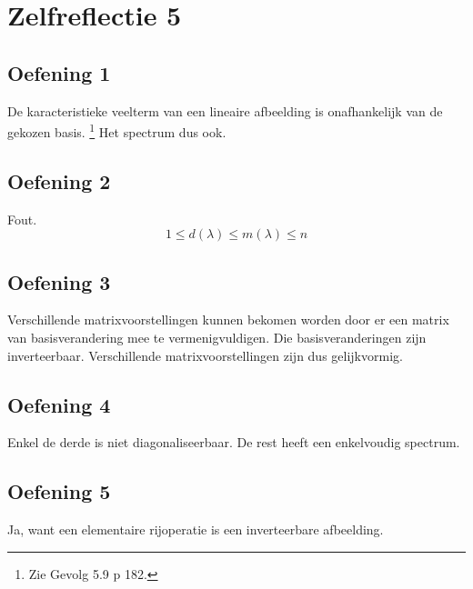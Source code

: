 \documentclass[lineaire_algebra_oplossingen.tex]{subfiles}
\begin{document}
\section{Zelfreflectie 5}
\subsection{Oefening 1}
De karacteristieke veelterm van een lineaire afbeelding is onafhankelijk van de gekozen basis. \footnote{Zie Gevolg 5.9 p 182.}
Het spectrum dus ook.

\subsection{Oefening 2}
Fout.
\[
1 \le d(\lambda) \le m(\lambda) \le n
\]

\subsection{Oefening 3}
Verschillende matrixvoorstellingen kunnen bekomen worden door er een matrix van basisverandering mee te vermenigvuldigen.
Die basisveranderingen zijn inverteerbaar. 
Verschillende matrixvoorstellingen zijn dus gelijkvormig.

\subsection{Oefening 4}
Enkel de derde is niet diagonaliseerbaar. De rest heeft een enkelvoudig spectrum.

\subsection{Oefening 5}
Ja, want een elementaire rijoperatie is een inverteerbare afbeelding.
\end{document}
